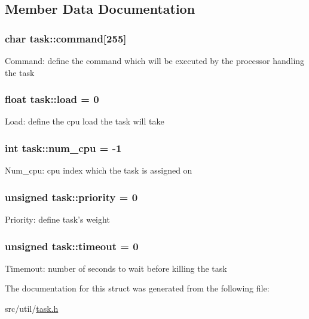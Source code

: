 \subsection{Member Data Documentation}
\hypertarget{structtask_a83f668482e53b3647813fd7dcbe9d137}{
\subsubsection[{command}]{\setlength{\rightskip}{0pt plus 5cm}char task\-::command\mbox{[}255\mbox{]}}}\label{structtask_a83f668482e53b3647813fd7dcbe9d137}
Command\-: define the command which will be executed by the processor handling the task \hypertarget{structtask_a42d5d60beb455655eb8a2d582e515cac}{
\subsubsection[{load}]{\setlength{\rightskip}{0pt plus 5cm}float task\-::load = 0}}\label{structtask_a42d5d60beb455655eb8a2d582e515cac}
Load\-: define the cpu load the task will take \hypertarget{structtask_a3ed4137e1d0a9047b2a62373958a0f05}{
\subsubsection[{num\-\_\-cpu}]{\setlength{\rightskip}{0pt plus 5cm}int task\-::num\-\_\-cpu = -\/1}}\label{structtask_a3ed4137e1d0a9047b2a62373958a0f05}
Num\-\_\-cpu\-: cpu index which the task is assigned on \hypertarget{structtask_a8ad08ffa8d99b3a1dff092a49080763d}{
\subsubsection[{priority}]{\setlength{\rightskip}{0pt plus 5cm}unsigned task\-::priority = 0}}\label{structtask_a8ad08ffa8d99b3a1dff092a49080763d}
Priority\-: define task's weight \hypertarget{structtask_a4fdb5bb3c0cb5b3db9f07e54563f678a}{
\subsubsection[{timeout}]{\setlength{\rightskip}{0pt plus 5cm}unsigned task\-::timeout = 0}}\label{structtask_a4fdb5bb3c0cb5b3db9f07e54563f678a}
Timemout\-: number of seconds to wait before killing the task 

The documentation for this struct was generated from the following file\-:\begin{DoxyCompactItemize}
\item 
src/util/\hyperlink{task_8h}{task.\-h}\end{DoxyCompactItemize}
